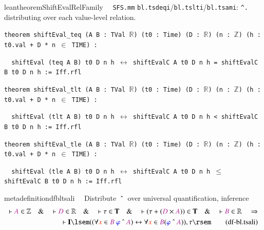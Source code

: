\begin{restatable}{leantheorem}{ShiftEvalRelFamily}~~ \texttt{SFS.mm} \texttt{bl.tsdeqi}/\texttt{bl.tslti}/\texttt{bl.tsami}: \texttt{\^{}.} distributing over each value-level relation.

\texttt{\textcolor{leancolor}{theorem} \textcolor{leanyellow}{shiftEval\_teq} (A B : TVal $\mathbb{R}$) (t0 : Time) (D : $\mathbb{R}$) (n : $\mathbb{Z}$) (h : t0.val + D * n $\in$ TIME) :}

\texttt{~~shiftEval (teq A B) t0 D n h $\leftrightarrow$ shiftEvalC A t0 D n h = shiftEvalC B t0 D n h := Iff.rfl}

\texttt{\textcolor{leancolor}{theorem} \textcolor{leanyellow}{shiftEval\_tlt} (A B : TVal $\mathbb{R}$) (t0 : Time) (D : $\mathbb{R}$) (n : $\mathbb{Z}$) (h : t0.val + D * n $\in$ TIME) :}

\texttt{~~shiftEval (tlt A B) t0 D n h $\leftrightarrow$ shiftEvalC A t0 D n h < shiftEvalC B t0 D n h := Iff.rfl}

\texttt{\textcolor{leancolor}{theorem} \textcolor{leanyellow}{shiftEval\_tle} (A B : TVal $\mathbb{R}$) (t0 : Time) (D : $\mathbb{R}$) (n : $\mathbb{Z}$) (h : t0.val + D * n $\in$ TIME) :}

\texttt{~~shiftEval (tle A B) t0 D n h $\leftrightarrow$ shiftEvalC A t0 D n h $\le$ shiftEvalC B t0 D n h := Iff.rfl}
\label{shiftEval_teq}
\label{shiftEval_tlt}
\label{shiftEval_tle}
\end{restatable}

\begin{restatable}{metadefinition}{dfbltsali}~~ Distribute $~\string^~$ over
universal quantification, inference
\begin{align}
\vdash \mc{A} \in \mathbb{Z}\quad\&\quad \vdash \mc{D} \in
    \mathbb{R}\quad\&\quad \vdash \tau \in \mathbf{T}\quad\&\quad \vdash ( \tau
    + ( \mc{D} \times \mc{A} ) ) \in \mathbf{T}\quad\&\quad \vdash \mc{B} \in
    \mathbb{R}\quad\Rightarrow \notag \\
    \quad \vdash \mathbf{I} \lsem ( ( \forall \msc{x}
    \in \mc{B}~\mw{\varphi} ~\string^~ \mc{A} ) \leftrightarrow \forall \msc{x}
    \in \mc{B} ( \mw{\varphi} ~\string^~ \mc{A} ) ) , \tau
    \rsem\label{eq:df-bl.tsali}\tag{df-bl.tsali}
\end{align}
\end{restatable}

